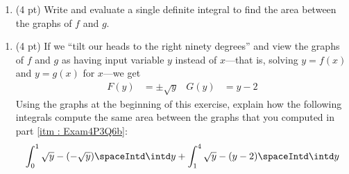 \newpage

\begin{enumerate}[resume,label=(\alph*)]
\item\label{itm : Exam4P3Q6b} (4 pt) Write and evaluate a single definite integral to find the area between the graphs of $f$ and $g$.
\end{enumerate}

\spaceSolution{3in}{%
}%



\begin{enumerate}[resume,label=(\alph*)]
\item\label{itm : Exam4P3Q6c} (4 pt) If we ``tilt our heads to the right ninety degrees'' and view the graphs of $f$ and $g$ as having input variable $y$ instead of $x$---that is, solving $y = f(x)$ and $y = g(x)$ for $x$---we get
\begin{align*}
F(y)
&=
\pm\sqrt{y}
&
G(y)
&=
y - 2
\end{align*}
Using the graphs at the beginning of this exercise, explain how the following integrals compute the same area between the graphs that you computed in part \ref{itm : Exam4P3Q6b}:
\begin{align*}
\int_{0}^{1} \sqrt{y} - (-\sqrt{y}) \spaceIntd \intd y
+
\int_{1}^{4} \sqrt{y} - (y - 2) \spaceIntd \intd y
\end{align*}
\end{enumerate}

\spaceSolution{3in}{%
}%